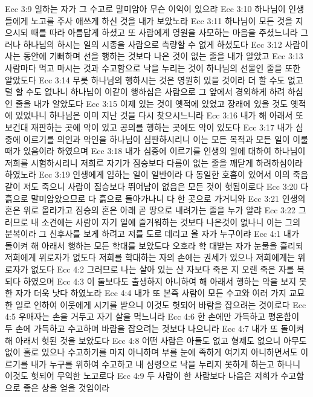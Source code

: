 Ecc 3:9  일하는 자가 그 수고로 말미암아 무슨 이익이 있으랴
Ecc 3:10  하나님이 인생들에게 노고를 주사 애쓰게 하신 것을 내가 보았노라
Ecc 3:11  하나님이 모든 것을 지으시되 때를 따라 아름답게 하셨고 또 사람에게 영원을 사모하는 마음을 주셨느니라 그러나 하나님의 하시는 일의 시종을 사람으로 측량할 수 없게 하셨도다
Ecc 3:12  사람이 사는 동안에 기뻐하며 선을 행하는 것보다 나은 것이 없는 줄을 내가 알았고
Ecc 3:13  사람마다 먹고 마시는 것과 수고함으로 낙을 누리는 것이 하나님의 선물인 줄을 또한 알았도다
Ecc 3:14  무릇 하나님의 행하시는 것은 영원히 있을 것이라 더 할 수도 없고 덜 할 수도 없나니 하나님이 이같이 행하심은 사람으로 그 앞에서 경외하게 하려 하심인 줄을 내가 알았도다
Ecc 3:15  이제 있는 것이 옛적에 있었고 장래에 있을 것도 옛적에 있었나니 하나님은 이미 지난 것을 다시 찾으시느니라
Ecc 3:16  내가 해 아래서 또 보건대 재판하는 곳에 악이 있고 공의를 행하는 곳에도 악이 있도다
Ecc 3:17  내가 심중에 이르기를 의인과 악인을 하나님이 심판하시리니 이는 모든 목적과 모든 일이 이룰 때가 있음이라 하였으며
Ecc 3:18  내가 심중에 이르기를 인생의 일에 대하여 하나님이 저희를 시험하시리니 저희로 자기가 짐승보다 다름이 없는 줄을 깨닫게 하려하심이라 하였노라
Ecc 3:19  인생에게 임하는 일이 일반이라 다 동일한 호흡이 있어서 이의 죽음같이 저도 죽으니 사람이 짐승보다 뛰어남이 없음은 모든 것이 헛됨이로다
Ecc 3:20  다 흙으로 말미암았으므로 다 흙으로 돌아가나니 다 한 곳으로 가거니와
Ecc 3:21  인생의 혼은 위로 올라가고 짐승의 혼은 아래 곧 땅으로 내려가는 줄을 누가 알랴
Ecc 3:22  그러므로 내 소견에는 사람이 자기 일에 즐거워하는 것보다 나은것이 없나니 이는 그의 분복이라 그 신후사를 보게 하려고 저를 도로 데리고 올 자가 누구이랴
Ecc 4:1  내가 돌이켜 해 아래서 행하는 모든 학대를 보았도다 오호라 학 대받는 자가 눈물을 흘리되 저희에게 위로자가 없도다 저희를 학대하는 자의 손에는 권세가 있으나 저희에게는 위로자가 없도다
Ecc 4:2  그러므로 나는 살아 있는 산 자보다 죽은 지 오랜 죽은 자를 복되다 하였으며
Ecc 4:3  이 둘보다도 출생하지 아니하여 해 아래서 행하는 악을 보지 못한 자가 더욱 낫다 하였노라
Ecc 4:4  내가 또 본즉 사람이 모든 수고와 여러 가지 교묘한 일로 인하여 이웃에게 시기를 받으니 이것도 헛되어 바람을 잡으려는 것이로다
Ecc 4:5  우매자는 손을 거두고 자기 살을 먹느니라
Ecc 4:6  한 손에만 가득하고 평온함이 두 손에 가득하고 수고하며 바람을 잡으려는 것보다 나으니라
Ecc 4:7  내가 또 돌이켜 해 아래서 헛된 것을 보았도다
Ecc 4:8  어떤 사람은 아들도 없고 형제도 없으니 아무도 없이 홀로 있으나 수고하기를 마지 아니하며 부를 눈에 족하게 여기지 아니하면서도 이르기를 내가 누구를 위하여 수고하고 내 심령으로 낙을 누리지 못하게 하는고 하나니 이것도 헛되어 무익한 노고로다
Ecc 4:9  두 사람이 한 사람보다 나음은 저희가 수고함으로 좋은 상을 얻을 것임이라
